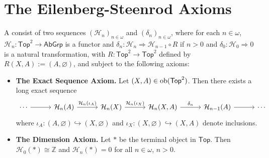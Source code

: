 \section*{The Eilenberg-Steenrod Axioms}

\begin{definition}
	A  consist of two sequences $(\mathcal{H}_n)_{n \in \omega}$ and $(\delta_n)_{n \in \omega}$, where for each $n \in \omega$, $\mathcal{H}_n : \mathsf{Top}^2 \to \mathsf{AbGrp}$ is a functor and $\delta_n : \mathcal{H}_n \Rightarrow \mathcal{H}_{n - 1} \circ R$ if $n > 0$ and $\delta_0 : \mathcal{H}_0 \Rightarrow 0$ is a natural transformation, with $R : \mathsf{Top}^2 \to \mathsf{Top}^2$ defined by $R(X,A) := (A,\varnothing)$, and subject to the following axioms:
	\begin{itemize}[wide = 0pt]
		\item \textbf{The Exact Sequence Axiom.} Let $(X,A) \in \operatorname{ob}(\mathsf{Top}^2)$. Then there exists a long exact sequence
			\begin{equation*}
				\begin{tikzcd}[column sep=7ex]
					\cdots \arrow[r] & \mathcal{H}_n(A) \arrow[r,"\mathcal{H}_n(\iota_A)"] & \mathcal{H}_n(X) \arrow[r,"\mathcal{H}_n(\iota_X)"] & \mathcal{H}_n(X,A) \arrow[r,"\delta_n"] & \mathcal{H}_{n - 1}(A) \arrow[r] & \cdots
				\end{tikzcd}
			\end{equation*}
			\noindent where $\iota_A : (A,\varnothing) \hookrightarrow (X,\varnothing)$ and $\iota_X : (X,\varnothing) \hookrightarrow (X,A)$ denote inclusions.
		\item \textbf{The Dimension Axiom.} Let $\ast$ be the terminal object in $\mathsf{Top}$. Then $\mathcal{H}_0(\ast) \cong \mathbb{Z}$ and $\mathcal{H}_n(\ast) = 0$ for all $n \in \omega$, $n > 0$. 
	\end{itemize}
\end{definition}
